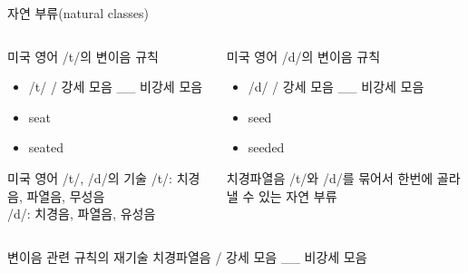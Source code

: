\documentclass[11pt, aspectratio=169]{beamer}
\newcommand{\textds}[1]{{\ipafont #1}}
\begin{document}
\begin{frame}[t]{자연 부류(natural classes)}
    \begin{columns}
        \begin{column}{0.46\textwidth}
            \begin{block}{미국 영어 \textds{/t/}의 변이음 규칙}
                \begin{itemize}
                    \item \textds{/t/} \rightarrow \textds{[ɾ]} / 강세 모음 \_\_ 비강세 모음
                    \item [] seat \textds{[sit]}
                    \item [] seated \textds{[siɾəd]}
                \end{itemize}
            \end{block}            
            \begin{block}{{미국 영어 \textds{/t/}, \textds{/d/}의 기술}}
                \textds{/t/}: 치경음, 파열음, 무성음\\
                \textds{/d/}: 치경음, 파열음, 유성음
            \end{block}            
        \end{column}
        \begin{column}{0.47\textwidth}
            \begin{block}{미국 영어 \textds{/d/}의 변이음 규칙}
                \begin{itemize}
                    \item \textds{/d/} \rightarrow \textds{[ɾ]} / 강세 모음 \_\_ 비강세 모음
                    \item [] seed \textds{[sid]}
                    \item [] seeded \textds{[siɾəd]}
                \end{itemize}
            \end{block}            
            \begin{block}{치경파열음}
                /t/와 /d/를 묶어서 한번에 골라낼 수 있는 자연 부류
            \end{block}
        \end{column}
    \end{columns}
    \begin{block}{\textds{[ɾ]} 변이음 관련 규칙의 재기술}
        치경파열음 \rightarrow \textds{[ɾ]} / 강세 모음 \_\_ 비강세 모음
    \end{block}            
\end{frame}
\end{document}
